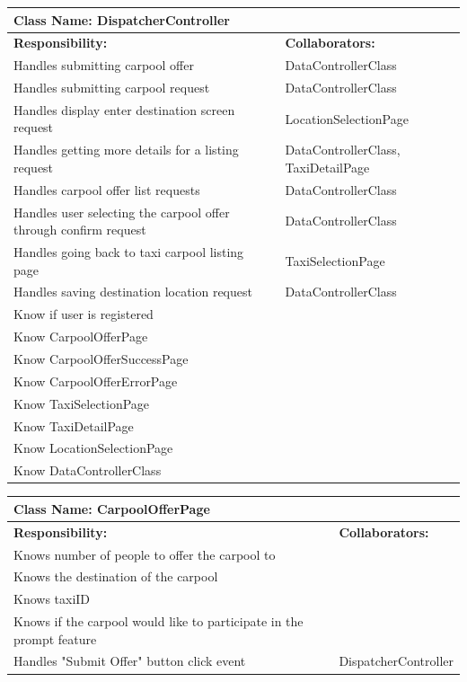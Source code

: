 \documentclass[]{article}
\begin{document}
	\begin{table}[H]
	\centering
	\begin{tabular}{|p{6cm}|p{6cm}|}
	\hline 
		\multicolumn{2}{|l|}{\textbf{Class Name: DispatcherController}} \\
	\hline
	\textbf{Responsibility:} & \textbf{Collaborators:} \\
	\hline
	Handles submitting carpool offer & DataControllerClass\\ \hline
    Handles submitting carpool request & DataControllerClass\\ \hline
	Handles display enter destination screen request & LocationSelectionPage\\ \hline
	Handles getting more details for a listing request & DataControllerClass, TaxiDetailPage\\ \hline
	Handles carpool offer list requests & DataControllerClass\\ \hline
	Handles user selecting the carpool offer through confirm request & DataControllerClass\\ \hline 
	Handles going back to taxi carpool listing page & TaxiSelectionPage\\ \hline
	Handles saving destination location request & DataControllerClass\\ \hline
	Know if user is registered & \\ \hline
	Know CarpoolOfferPage & \\ \hline 
	Know CarpoolOfferSuccessPage & \\ \hline 
	Know CarpoolOfferErrorPage & \\ \hline 
	Know TaxiSelectionPage & \\ \hline
	Know TaxiDetailPage & \\ \hline
	Know LocationSelectionPage & \\ \hline
	Know DataControllerClass & \\ \hline
	\end{tabular}
	\end{table}

	\begin{table}[H]
	\centering
	\begin{tabular}{|p{6cm}|p{6cm}|}
	\hline 
		\multicolumn{2}{|l|}{\textbf{Class Name: CarpoolOfferPage}} \\
	\hline
	\textbf{Responsibility:} & \textbf{Collaborators:} \\
	\hline
	Knows number of people to offer the carpool to &\\ \hline
	Knows the destination of the carpool &\\ \hline
	Knows taxiID &\\ \hline
	Knows if the carpool would like to participate in the prompt feature & \\ \hline
	Handles "Submit Offer" button click event  & DispatcherController\\ \hline
	\end{tabular}
	\end{table}
\end{document}
